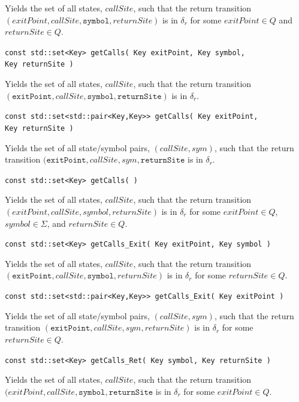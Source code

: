 \documentclass{llncs}
\begin{document}
\begin{description}
    Yields the set of all states, $callSite$, such that the return transition $(exitPoint,callSite,\texttt{symbol},returnSite)$ is in $\delta_r$ for some $exitPoint \in Q$ and $returnSite \in Q$.

  \item\texttt{const std::set<Key> getCalls( Key exitPoint, Key symbol,\\ \hspace*{3.25cm} Key returnSite )} \nopagebreak

    Yields the set of all states, $callSite$, such that the return transition $(\texttt{exitPoint},callSite,\texttt{symbol},\texttt{returnSite})$ is in $\delta_r$.

  \item\texttt{const std::set<std::pair<Key,Key>> getCalls( Key exitPoint,\\ \hspace*{3.25cm} Key returnSite )} \nopagebreak

    Yields the set of all state/symbol pairs, $(callSite,sym)$, such that the return transition $(\texttt{exitPoint},callSite,sym,\texttt{returnSite}$ is in $\delta_r$.

  \item\texttt{const std::set<Key> getCalls( )} \nopagebreak

    Yields the set of all states, $callSite$, such that the return transition $(exitPoint,callSite,symbol,returnSite)$ is in $\delta_r$ for some $exitPoint \in Q$, $symbol \in \Sigma$, and $returnSite \in Q$.

  \item\texttt{const std::set<Key> getCalls\_Exit( Key exitPoint, Key symbol )} \nopagebreak

    Yields the set of all states, $callSite$, such that the return transition $(\texttt{exitPoint},callSite,\texttt{symbol},returnSite)$ is in $\delta_r$ for some $returnSite \in Q$.

  \item\texttt{const std::set<std::pair<Key,Key>> getCalls\_Exit( Key exitPoint )} \nopagebreak

    Yields the set of all state/symbol pairs, $(callSite,sym)$, such that the return transition $(\texttt{exitPoint},callSite,sym,returnSite)$ is in $\delta_r$ for some $returnSite \in Q$.

  \item\texttt{const std::set<Key> getCalls\_Ret( Key symbol, Key returnSite )} \nopagebreak

    Yields the set of all states, $callSite$, such that the return transition $(exitPoint,callSite,\texttt{symbol},\texttt{returnSite}$ is in $\delta_r$ for some $exitPoint \in Q$.


\end{description}
\end{document}
